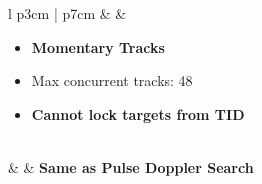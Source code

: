 \documentclass[8pt,usenames,dvipsnames,twoside]{article}
\begin{document}
\begin{center}
\begin{longtable}{l p{3cm} | p{7cm}}
				\midrule
				\textbullet &  & 
				\begin{minipage}[t]{\linewidth}
					\vspace{-7pt}
					\begin{itemize}
						\item \textbf{Momentary Tracks}
						\item Max concurrent tracks: 48
						\item \textbf{Cannot lock targets from TID}
					\end{itemize}
				\end{minipage} \\
				\midrule
				\textbullet &  & \textbf{Same as Pulse Doppler Search} \\
				\bottomrule
			\end{longtable}
		\end{center}
	
		\clearpage
		
\end{document}
